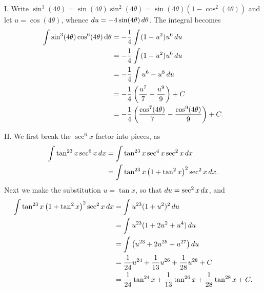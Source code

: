\documentclass[]{ximera}
\begin{document}
\begin{freeResponse}
I. Write $\sin^3(4\theta) = \sin(4\theta) \sin^2(4\theta) = \sin(4\theta) (1-\cos^2(4\theta))$ and let $u = \cos(4\theta)$, whence $\mathop{}\!d u = -4 \sin (4\theta) \mathop{}\!d \theta$. The integral becomes
\begin{align*}
\int \sin^3 (4 \theta) \cos^6 (4\theta) \, \mathrm{d}\theta &= -\frac{1}{4} \int (1-u^2)u^6 \mathop{}\!d u \\
&= -\frac{1}{4} \int (1-u^2)u^6 \mathop{}\!d u \\
&= -\frac{1}{4} \int u^6 - u^8 \mathop{}\!d u \\
&= -\frac{1}{4}\left(\frac{u^7}{7} - \frac{u^9}{9}\right) + C \\
&= -\frac{1}{4}\left(\frac{\cos^7(4\theta)}{7} - \frac{\cos^9(4\theta)}{9}\right) + C.
\end{align*}

II. We first break the $\sec^6 x$ factor into pieces, as 
	\begin{align*}
		\int \tan^{23} x \sec^6 x \mathop{}\!d x 
		&= \int \tan^{23} x \sec^4 x \sec^2 x \mathop{}\!d x  \\
		&= \int \tan^{23} x \left( 1 + \tan^2 x \right)^2 \sec^2 x \mathop{}\!d x .
		\end{align*}
	Next we make the substitution $u = \tan x$, so that $\mathop{}\!d u = \sec^2 x \mathop{}\!d x$, and
		\begin{align*}
		\int \tan^{23} x \left( 1 + \tan^2 x \right)^2 \sec^2 x \mathop{}\!d x
		&= \int u^{23} (1+u^2)^2 \mathop{}\!d u  \\
		&= \int u^{23} (1 + 2u^2 + u^4) \mathop{}\!d u  \\
		&= \int \left( u^{23} + 2u^{25} + u^{27} \right) \mathop{}\!d u  \\
		&= \frac{1}{24} u^{24} + \frac{1}{13} u^{26} + \frac{1}{28} u^{28} + C  \\
		&= \frac{1}{24} \tan^{24} x + \frac{1}{13} \tan^{26} x + \frac{1}{28} \tan^{28} x + C.
		\end{align*}
		

\end{freeResponse}
\end{document}
